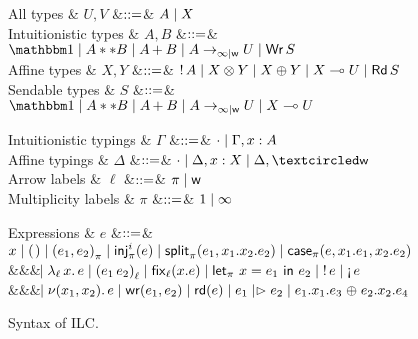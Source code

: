 \begin{figure*}[t]
  \centering
  \begin{minipage}{.58\textwidth}
    \centering
    \begin{grammar}
        All types
      & $U, V$
        &$\mathrel{::=}$& $A \mathrel{\mid} X$
      \\      
      Intuitionistic types
      & $A,B$
      &$\mathrel{::=}$& $\tyUnit \bnfalt A ** B \bnfalt \tySum{A}{}{B} \bnfalt
      \tyArr{A}{\infty \mid \wm}{U} \bnfalt \tyWr{S}$
      \\
      Affine types
      & $X,Y$
      &$\mathrel{::=}$& ${!}\,{A} \mathrel{\mid}
      {X}\otimes{Y} \mathrel{\mid} {X}\oplus{Y} \mathrel{\mid} X \multimap U \mathrel{\mid} \textnormal{\textsf{Rd}}\,S$
      \\
      Sendable types
      & $S$
      &$\mathrel{::=}$& $\tyUnit \bnfalt A ** B \bnfalt \tySum{A}{}{B} \bnfalt
      \tyArr{A}{\infty \mid \wm}{U} \bnfalt X \multimap U$
    \end{grammar}      
  \end{minipage}%
  \begin{minipage}{.42\textwidth}
    \centering
    \begin{grammar}
      Intuitionistic typings
      & $\Gamma$
      &$\mathrel{::=}$& $\cdot \mathrel{\mid} \Gamma,x:A$
      \\
      Affine typings
      & $\Delta$
      &$\mathrel{::=}$& $\emptyctxt \bnfalt \Delta,x:X \bnfalt \Delta, \wrtok$
      \\
      Arrow labels
      & $\ell$
      &$\mathrel{::=}$& $\pi \mathrel{\mid} \textsf{w}$
      \\            
      Multiplicity labels
      & $\pi$
      &$\mathrel{::=}$& $1 \mathrel{\mid} \infty$
    \end{grammar}    
  \end{minipage}
  \begin{grammar}
    Expressions
    & $e$
    &$\mathrel{::=}$&
    $\eVar{x} \bnfalt \eUnit \bnfalt \ePair{e_1}{e_2}{\pi} \bnfalt \eInj{i}{e}
    \bnfalt \eSplit{e_1}{x_1}{x_2}{e_2} \bnfalt
    \eCase{\pi}{e}{x_1}{e_1}{x_2}{e_2}$
    \\ &&& $\hspace{-1.02ex}\mathrel{\mid} \lambda_{\ell}\,{x}.\,{e} \mathrel{\mid} \mathsf{(} e_1\,e_2\mathsf{)}_{\ell} \mathrel{\mid} \textnormal{\textsf{fix}}_{\ell}\mathsf{(}{x}.{e}\mathsf{)}
    \mathrel{\mid} \textnormal{\textsf{let}}_{\pi}\ {x} = {e_1}\ \textnormal{\textsf{in}}\ {e_2} \mathrel{\mid} {!}\,{e} \mathrel{\mid} \textnormal{!`}\,{e}$
    \\ &&& $\hspace{-1.02ex}\mathrel{\mid} \nu(x_1,x_2).\,e \mathrel{\mid} \textnormal{\textsf{wr}}\mathsf{(}{e_1},{e_2}\mathsf{)}
    \mathrel{\mid} \textnormal{\textsf{rd}}\mathsf{(}{e}\mathsf{)} \mathrel{\mid} e_1 \mathrel{|\rhd} e_2 \mathrel{\mid} {e_1}.{x_1}.{e_3} \mathrel{\oplus} {e_2}.{x_2}.{e_4}$
  \end{grammar}      
  \caption{Syntax of ILC.}
  \label{fig:ilc-syntax}
\end{figure*}
